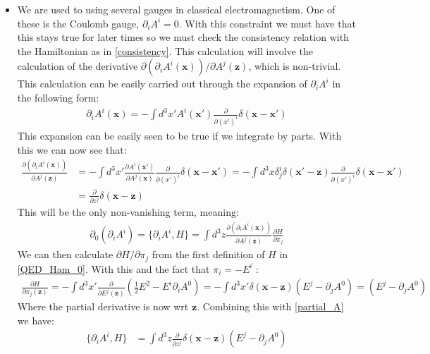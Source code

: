 \documentclass[11pt]{article}
\numberwithin{equation}{section}
\begin{document}
\begin{itemize}
   \item We are used to using several gauges in classical electromagnetism. One of these is the Coulomb gauge, $\partial_iA^i = 0$. With this constraint we must have that this stays true for later times so we must check the consistency relation with the Hamiltonian as in \ref{consistency}. This calculation will involve the calculation of the derivative $\partial\left(\partial_iA^i(\textbf{x})\right)/\partial A^j(\textbf{z})$, which is non-trivial. This calculation can be easily carried out through the expansion of $\partial_iA^i$ in the following form:
   \begin{align}
   \label{delta_prop}
     \partial_iA^i(\textbf{x}) = -\int d^3x'A^i(\textbf{x}')\frac{\partial }{\partial(x')^i}\delta(\textbf{x}-\textbf{x}')
   \end{align}
   This expansion can be easily seen to be true if we integrate by parts. With this we can now see that:
   \begin{align}
   \label{partial_A}
     \frac{\partial\left(\partial_iA^i(\textbf{x})\right)}{\partial A^j(\textbf{z})} &= -\int d^3x'\frac{\partial A^i(\textbf{x}')}{\partial A^j(\textbf{x})}\frac{\partial}{\partial (x')^i}\delta(\textbf{x}-\textbf{x}') = -\int d^3x\delta^{i}_j\delta(\textbf{x}'-\textbf{z})\frac{\partial}{\partial (x')^i}\delta(\textbf{x}-\textbf{x}') \nonumber \\
     & = \frac{\partial}{\partial z^j}\delta(\textbf{x}-\textbf{z}) 
   \end{align}
   This will be the only non-vanishing term, meaning:
   \begin{align*}
    \partial_0(\partial_iA^i)  = \{\partial_iA^i,H\}  = \int d^3z\frac{\partial\left(\partial_iA^i(\textbf{x})\right)}{\partial A^j(\textbf{z})}\frac{\partial H}{\partial \pi_j}
   \end{align*}
   We can then calculate $\partial H/\partial \pi_j$ from the first definition of $H$ in \ref{QED_Ham_0}. With this and the fact that $\pi_{i} = -E^i$ :
   \begin{align*}
      \frac{\partial H}{\partial \pi_j(\textbf{z})} = -\int d^3x'\frac{\partial}{\partial E^j(\textbf{z})}\left(\frac{1}{2}E^2-E^i\partial_iA^0\right) = -\int d^3x'\delta(\textbf{x}-\textbf{z})(E^j - \partial_jA^0)=(E^j - \partial_jA^0)
    \end{align*} 
    Where the partial derivative is now wrt $\textbf{z}$. Combining this with \ref{partial_A} we have:
    \begin{align*}
      \{\partial_iA^i,H\}  &= \int d^3z\frac{\partial}{\partial z^j}\delta(\textbf{x}-\textbf{z})\left(E^j - \partial_jA^0\right) \\

\end{align*}
\end{itemize}
\end{document}
